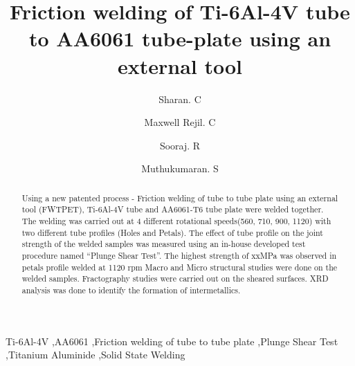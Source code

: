\documentclass[3p]{elsarticle}
\begin{document}
\newcommand{\degree}{\ensuremath{^{\circ}}}  %


\begin{frontmatter}

\title{Friction welding of Ti-6Al-4V tube to AA6061 tube-plate using an external tool}

\author[META]{Sharan. C}
\author[META]{Maxwell Rejil. C}
\author[META]{Sooraj. R}
\author[META]{Muthukumaran. S}


\address[META]{Department of Metallurgical and Materials Engineering, National Institute of Technology, Tiruchirappalli-620015, India}
         
\begin{abstract}
Using a new patented process - Friction welding of tube to tube plate using an external tool (FWTPET), Ti-6Al-4V tube and AA6061-T6 tube plate were welded together. The welding was carried out at 4 different rotational speeds(560, 710, 900, 1120) with two different tube profiles (Holes and Petals). The effect of tube profile on the joint strength of the welded samples was measured using an in-house developed test procedure named ``Plunge Shear Test''. The highest strength of xxMPa was observed in petals profile welded at 1120 rpm Macro and Micro structural studies were done on the welded samples. Fractography studies were carried out on the  sheared surfaces. XRD analysis was done to identify the formation of intermetallics.
\end{abstract}

\begin{keyword}
Ti-6Al-4V \sep AA6061 \sep Friction welding of tube to tube plate \sep Plunge Shear Test \sep Titanium Aluminide \sep  Solid State Welding
\end{keyword}

\end{frontmatter}

\end{document}
